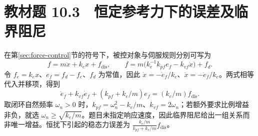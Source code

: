 \section*{教材题 10.3　恒定参考力下的误差及临界阻尼}
\label{hw:control-10-3}
在第\ref{sec:force-control}节的符号下，被控对象与伺服规则分别可写为
\[
 f=m\ddot x+k_e x+f_{\mathrm{dis}},\qquad
 f=m\bigl(k_e^{-1}k_{pf}e_f-k_{vf}\dot x\bigr)+f_d.
\]
令 $f_e=k_ex$、$e_f=f_d-f_e$、$f_d$ 为常值，因此 $\dot x=-\dot e_f/k_e$、$\ddot x=-\ddot e_f/k_e$。两式相等代入并移项，得到
\[
 \boxed{\ddot e_f+k_{vf}\dot e_f+(k_{pf}+k_e/m)e_f=(k_e/m)f_{\mathrm{dis}}}.
\]
取闭环自然频率 $\omega_n>0$ 时，$k_{pf}=\omega_n^2-k_e/m$、$k_{vf}=2\omega_n$；若额外要求比例增益非负，就选 $\omega_n\ge\sqrt{k_e/m}$。题目未指定响应速度，因此临界阻尼给出一组关系而非唯一增益。恒扰下引起的稳态力误差为 $\frac{k_e/m}{k_{pf}+k_e/m}f_{\mathrm{dis}}$。
